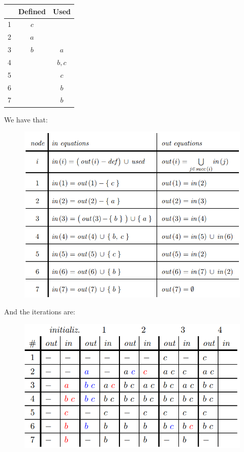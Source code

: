 \documentclass[12pt, a4paper]{report}
\newtheorem[style=M,bodystyle=\normalfont]{theorem}{Theorem}
\newtheorem[style=M,bodystyle=\normalfont]{corollary}{Corollary}
\newtheorem[style=M,bodystyle=\normalfont]{lemma}{Lemma}
\newtheorem[style=M,bodystyle=\normalfont]{definition}{Definition}
\begin{document}
\begin{enumerate}
\begin{table}[H]
                    \centering
                    \begin{tabular}{l|c|c|}
                    \cline{2-3}
                                            & \textbf{Defined} & \textbf{Used} \\ \hline
                    \multicolumn{1}{|l|}{1} & $c$              &               \\
                    \multicolumn{1}{|l|}{2} & $a$              &               \\
                    \multicolumn{1}{|l|}{3} & $b$              & $a$           \\
                    \multicolumn{1}{|l|}{4} &                  & $b,c$         \\
                    \multicolumn{1}{|l|}{5} &                  & $c$           \\
                    \multicolumn{1}{|l|}{6} &                  & $b$           \\
                    \multicolumn{1}{|l|}{7} &                  & $b$           \\ \hline
                    \end{tabular}
                \end{table}
                We have that: 
                \begin{figure}[H]
                    \centering
                    \includegraphics[width=0.75\linewidth]{images/dataflow.png}
                \end{figure} 
                And the iterations are: 
                \begin{figure}[H]
                    \centering
                    \includegraphics[width=0.75\linewidth]{images/dataflowit.png}

\end{figure}
\end{enumerate}
\end{document}
